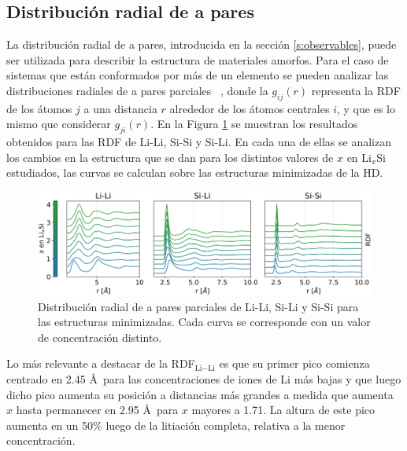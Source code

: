 \subsection{Distribución radial de a pares}

La distribución radial de a pares, introducida en la sección \ref{s:observables},
puede ser utilizada para describir la estructura de materiales amorfos. Para el 
caso de sistemas que están conformados por más de un elemento se pueden analizar 
las distribuciones radiales de a pares parciales ~\cite{lamparter1995}, donde la 
$g_{ij}(r)$ representa la RDF de los átomos $j$ a una distancia $r$ alrededor de 
los átomos centrales $i$, y que es lo mismo que considerar $g_{ji}(r)$. En la 
Figura \ref{fig:rdf} se muestran los resultados obtenidos para las RDF de Li-Li, 
Si-Si y Si-Li. En cada una de ellas se analizan los cambios en la estructura que 
se dan para los distintos valores de $x$ en Li$_x$Si estudiados, las curvas se 
calculan sobre las estructuras minimizadas de la HD.

\begin{figure}[t]
    \centering
    \includegraphics[width=\textwidth]{Silicio/caracterizacion/resultados/rdf/rdf.png}
    \caption{Distribución radial de a pares parciales de Li-Li, Si-Li y Si-Si 
    para las estructuras minimizadas. Cada curva se corresponde con un valor de 
    concentración distinto.}
    \label{fig:rdf}
\end{figure}

Lo más relevante a destacar de la RDF$_{\text{Li}-\text{Li}}$ es que su primer 
pico comienza 
centrado en 2.45 \AA\ para las concentraciones de iones de Li más bajas y que 
luego dicho pico aumenta su posición a distancias más grandes a medida que aumenta
$x$ hasta permanecer en 2.95 \AA\ para $x$ mayores a 1.71. La altura de este pico
aumenta en un 50\% luego de la litiación completa, relativa a la menor 
concentración.

